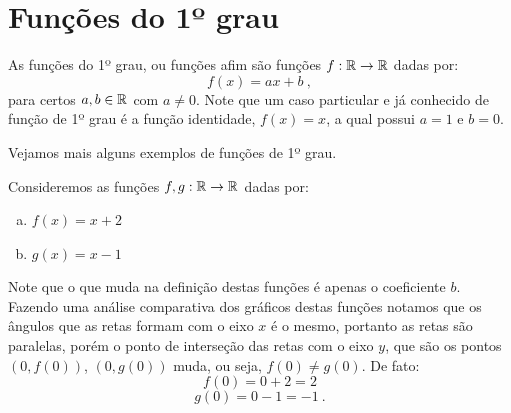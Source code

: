 \section{Funções do 1º grau}
 As funções do 1º grau, ou funções afim são funções $f: \mathbb{R} \rightarrow \mathbb{R}$ dadas por:
\begin{equation*}
f(x)= ax + b \ , 
\end{equation*}
para certos $a, b \in \mathbb{R}$ com $a \neq 0$. Note que um caso particular e já conhecido de função de 1º grau é a função identidade, $f(x)= x$, a qual possui $a=1$ e $b=0$.

 Vejamos mais alguns exemplos de funções de 1º grau.

\begin{exem}
 Consideremos as funções $f, g: \mathbb{R} \to \mathbb{R}$ dadas por:
 \begin{enumerate}[a)]
  \item $f(x)= x+2$
  \item $g(x)= x-1$
 \end{enumerate}


 \begin{figure}[H]
  \end{figure}
  Note que o que muda na definição destas funções é apenas o coeficiente $b$. Fazendo uma análise comparativa dos gráficos destas funções notamos que os ângulos que as retas formam com o eixo $x$ é o mesmo, portanto as retas são paralelas, porém o ponto de interseção das retas com o eixo $y$, que são os pontos $(0, f(0))$, $(0, g(0))$ muda, ou seja, $f(0) \neq g(0)$. De fato:
\begin{equation*}
f(0)= 0 + 2= 2
\end{equation*}
\begin{equation*}
g(0)= 0 -1 = -1 \ .
\end{equation*}
\end{exem}
  
